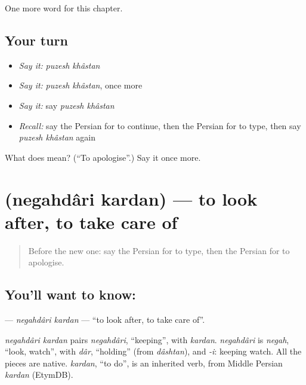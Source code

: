 \begin{grammarlens}[title={What you've built}]
One more word for this chapter.
\end{grammarlens}

\subsection*{Your turn}
\begin{itemize}
\raggedright
  \item \emph{Say it:} \emph{puzesh khâstan}
  \item \emph{Say it:} \emph{puzesh khâstan}, once more
  \item \emph{Say it:} say \emph{puzesh khâstan}
  \item \emph{Recall:} say the Persian for to continue, then the Persian for to type, then say \emph{puzesh khâstan} again
\end{itemize}

\begin{tcolorbox}[breakable,colback=teal!4,colframe=teal!35!black,title={Before you move on}]
What does   mean? (\textquotedblleft{}To apologise\textquotedblright{}.) Say it once more.
\end{tcolorbox}
\section[\texorpdfstring{\fa{نگهداری} \fa{کردن} (negahdâri kardan)}{نگهداری کردن (negahdâri kardan)}]{  (negahdâri kardan) — to look after, to take care of}

\label{lesson:FA-C145-negahdari-kardan}



\begin{quote}
Before the new one: say the Persian for to type, then the Persian for to apologise.
\end{quote}

\subsection*{You'll want to know:  }
\textbf{ } — \emph{negahdâri kardan} — \textquotedblleft{}to look after, to take care of\textquotedblright{}.

\begin{cousinweb}
\emph{negahdâri kardan} pairs \emph{negahdâri}, \textquotedblleft{}keeping\textquotedblright{}, with \emph{kardan}. \emph{negahdâri} is \emph{negah}, \textquotedblleft{}look, watch\textquotedblright{}, with \emph{dâr}, \textquotedblleft{}holding\textquotedblright{} (from \emph{dâshtan}), and \emph{-i}: keeping watch. All the pieces are native. \emph{kardan}, \textquotedblleft{}to do\textquotedblright{}, is an inherited verb, from Middle Persian \emph{kardan} (EtymDB).
\end{cousinweb}

